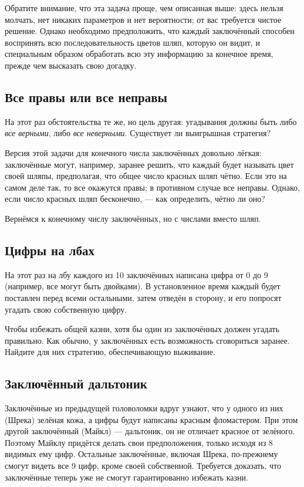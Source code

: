 Обратите внимание, что эта задача проще, чем описанная выше:
здесь нельзя молчать, нет никаких параметров и нет вероятности;
от вас требуется чистое решение.
Однако необходимо предположить, что каждый заключённый способен воспринять всю последовательность цветов шляп, которую он видит, и специальным образом обработать всю эту информацию за конечное время, прежде чем высказать свою догадку.


\subsection*{Все правы или все неправы}

На этот раз обстоятельства те же, но цель другая:
угадывания должны быть либо \emph{все верными}, либо \emph{все неверными}.
Существует ли выигрышная стратегия?

Версия этой задачи для конечного числа заключённых довольно лёгкая:
заключённые могут, например, заранее решить, что каждый будет называть цвет своей шляпы, предполагая, что общее число красных шляп чётно.
Если это на самом деле так, то все окажутся правы;
в противном случае все неправы.
Однако, если число красных шляп бесконечно, --- как определить, чётно ли оно?

\medskip

Вернёмся к конечному числу заключённых, но с числами вместо шляп.

\subsection*{Цифры на лбах}

На этот раз на лбу каждого из 10 заключённых написана цифра от 0 до 9 (например, все могут быть двойками).
В установленное время каждый будет поставлен перед всеми остальными, затем отведён в сторону, и его попросят угадать свою собственную цифру.

Чтобы избежать общей казни, хотя бы один из заключённых должен угадать правильно.
Как обычно, у заключённых есть возможность сговориться заранее.
Найдите для них стратегию, обеспечивающую выживание.

\subsection*{Заключённый дальтоник}

Заключённые из предыдущей головоломки вдруг узнают, что у одного из них (Шрека) зелёная кожа, а цифры будут написаны красным фломастером.
При этом другой заключённый (Майкл) --- дальтоник, он не отличает красное от зелёного.
Поэтому Майклу придётся делать свои предположения, только исходя из 8 видимых ему цифр.
Остальные заключённые, включая Шрека, по-прежнему смогут видеть все 9 цифр, кроме своей собственной.
Требуется доказать, что заключённые теперь уже не смогут гарантированно избежать казни.

